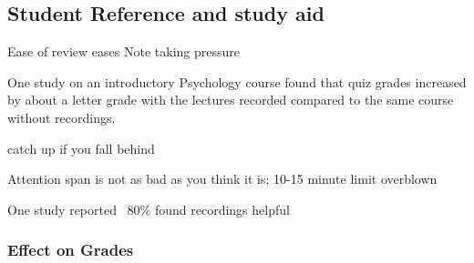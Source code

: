 \documentclass[sigconf]{acmart}
\begin{document}
\subsection{Student Reference and study aid}


Ease of review
eases Note taking pressure


One study \cite{shimoff2001effects}  on an introductory Psychology course found that quiz grades increased by about a letter grade with the lectures recorded compared to the same course without recordings.

catch up if you fall behind \cite{young2008lectures}

Attention span is not as bad as you think it is; 10-15 minute limit overblown \cite{bradbury2016attention} \cite{wilson2007attention}

One study reported ~80\% found recordings helpful \cite{maynor2013student}


\subsubsection{Effect on Grades}
\end{document}
